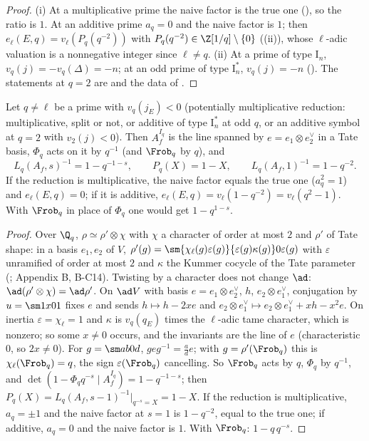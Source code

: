 \begin{proof}
(i) At a multiplicative prime the naive factor is the true one (), so the ratio is $1$. At an additive prime $a_q=0$ and the naive factor is
$1$; then $e_\ell(E,q)=v_\ell(P_q(q^{-2}))$ with $P_q(q^{-2})\in\Z[1/q]\setminus\{0\}$ ((ii)), whose $\ell$-adic valuation is a nonnegative integer since
$\ell\ne q$. (ii) At a prime of type $\mathrm I_n$, $v_q(j)=-v_q(\Delta)=-n$; at an odd prime of type $\mathrm I_n^*$, $v_q(j)=-n$ (). The statements at $q=2$
are  and the data of .
\end{proof}

\begin{proposition}\label{prop:lfunctions:multiplicative}
Let $q\ne\ell$ be a prime with $v_q(j_E)<0$ (potentially multiplicative reduction: multiplicative, split or not, or additive of type $\mathrm I_n^*$ at odd $q$, or
an additive symbol at $q=2$ with $v_2(j)<0$). Then $A_f^{I_q}$ is the line spanned by $e=e_1\otimes e_2^\vee$ in a Tate basis, $\Phi_q$ acts on it by $q^{-1}$ (and $\Frob_q$ by $q$), and
\[
L_q(A_f,s)^{-1}=1-q^{-1-s},\qquad P_q(X)=1-X,\qquad L_q(A_f,1)^{-1}=1-q^{-2}.
\]
If the reduction is multiplicative, the naive factor equals the true one ($a_q^2=1$) and $e_\ell(E,q)=0$; if it is additive, $e_\ell(E,q)=v_\ell(1-q^{-2})=v_\ell(q^2-1)$. With $\Frob_q$
in place of $\Phi_q$ one would get $1-q^{1-s}$.
\end{proposition}

\begin{proof}
Over $\Q_q$, $\rho\simeq\rho'\otimes\chi$ with $\chi$ a character of order at most $2$ and $\rho'$ of Tate shape: in a basis $e_1,e_2$ of $V$,
$\rho'(g)=\sm{\chi_\ell(g)\varepsilon(g)}{\varepsilon(g)\kappa(g)}0{\varepsilon(g)}$ with $\varepsilon$ unramified of order at most $2$ and $\kappa$ the Kummer cocycle of the Tate parameter
(; Appendix B, B-C14). Twisting by a character does not change $\ad$: $\ad(\rho'\otimes\chi)=\ad\rho'$. On $\ad V$ with basis $e=e_1\otimes e_2^\vee$, $h$, $e_2\otimes e_1^\vee$,
conjugation by $u=\sm1x01$ fixes $e$ and sends $h\mapsto h-2xe$ and $e_2\otimes e_1^\vee\mapsto e_2\otimes e_1^\vee+xh-x^2e$. On inertia $\varepsilon=\chi_\ell=1$ and $\kappa$ is $v_q(q_E)$ times the
$\ell$-adic tame character, which is nonzero; so some $x\ne0$ occurs, and the invariants are the line of $e$ (characteristic $0$, so $2x\ne0$). For $g=\sm ab0d$,
$geg^{-1}=\frac ade$; with $g=\rho'(\Frob_q)$ this is $\chi_\ell(\Frob_q)=q$, the sign $\varepsilon(\Frob_q)$ cancelling. So $\Frob_q$ acts by $q$, $\Phi_q$ by $q^{-1}$, and
$\det(1-\Phi_qq^{-s}\mid A_f^{I_q})=1-q^{-1-s}$; then $P_q(X)=L_q(A_f,s-1)^{-1}|_{q^{-s}=X}=1-X$. If the reduction is multiplicative, $a_q=\pm1$ and the naive factor at $s=1$ is
$1-q^{-2}$, equal to the true one; if additive, $a_q=0$ and the naive factor is $1$. With $\Frob_q$: $1-q\,q^{-s}$.
\end{proof}

